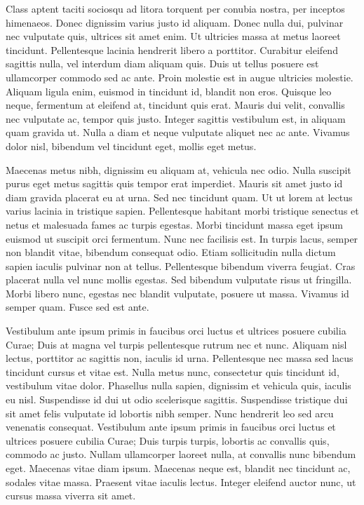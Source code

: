 \documentclass{EPUProjetDi}
\begin{document}
Class aptent taciti sociosqu ad litora torquent per conubia nostra, per inceptos himenaeos. Donec dignissim varius justo id aliquam. Donec nulla dui, pulvinar nec vulputate quis, ultrices sit amet enim. Ut ultricies massa at metus laoreet tincidunt. Pellentesque lacinia hendrerit libero a porttitor. Curabitur eleifend sagittis nulla, vel interdum diam aliquam quis. Duis ut tellus posuere est ullamcorper commodo sed ac ante. Proin molestie est in augue ultricies molestie. Aliquam ligula enim, euismod in tincidunt id, blandit non eros. Quisque leo neque, fermentum at eleifend at, tincidunt quis erat. Mauris dui velit, convallis nec vulputate ac, tempor quis justo. Integer sagittis vestibulum est, in aliquam quam gravida ut. Nulla a diam et neque vulputate aliquet nec ac ante. Vivamus dolor nisl, bibendum vel tincidunt eget, mollis eget metus.

Maecenas metus nibh, dignissim eu aliquam at, vehicula nec odio. Nulla suscipit purus eget metus sagittis quis tempor erat imperdiet. Mauris sit amet justo id diam gravida placerat eu at urna. Sed nec tincidunt quam. Ut ut lorem at lectus varius lacinia in tristique sapien. Pellentesque habitant morbi tristique senectus et netus et malesuada fames ac turpis egestas. Morbi tincidunt massa eget ipsum euismod ut suscipit orci fermentum. Nunc nec facilisis est. In turpis lacus, semper non blandit vitae, bibendum consequat odio. Etiam sollicitudin nulla dictum sapien iaculis pulvinar non at tellus. Pellentesque bibendum viverra feugiat. Cras placerat nulla vel nunc mollis egestas. Sed bibendum vulputate risus ut fringilla. Morbi libero nunc, egestas nec blandit vulputate, posuere ut massa. Vivamus id semper quam. Fusce sed est ante.

Vestibulum ante ipsum primis in faucibus orci luctus et ultrices posuere cubilia Curae; Duis at magna vel turpis pellentesque rutrum nec et nunc. Aliquam nisl lectus, porttitor ac sagittis non, iaculis id urna. Pellentesque nec massa sed lacus tincidunt cursus et vitae est. Nulla metus nunc, consectetur quis tincidunt id, vestibulum vitae dolor. Phasellus nulla sapien, dignissim et vehicula quis, iaculis eu nisl. Suspendisse id dui ut odio scelerisque sagittis. Suspendisse tristique dui sit amet felis vulputate id lobortis nibh semper. Nunc hendrerit leo sed arcu venenatis consequat. Vestibulum ante ipsum primis in faucibus orci luctus et ultrices posuere cubilia Curae; Duis turpis turpis, lobortis ac convallis quis, commodo ac justo. Nullam ullamcorper laoreet nulla, at convallis nunc bibendum eget. Maecenas vitae diam ipsum. Maecenas neque est, blandit nec tincidunt ac, sodales vitae massa. Praesent vitae iaculis lectus. Integer eleifend auctor nunc, ut cursus massa viverra sit amet.
\end{document}
